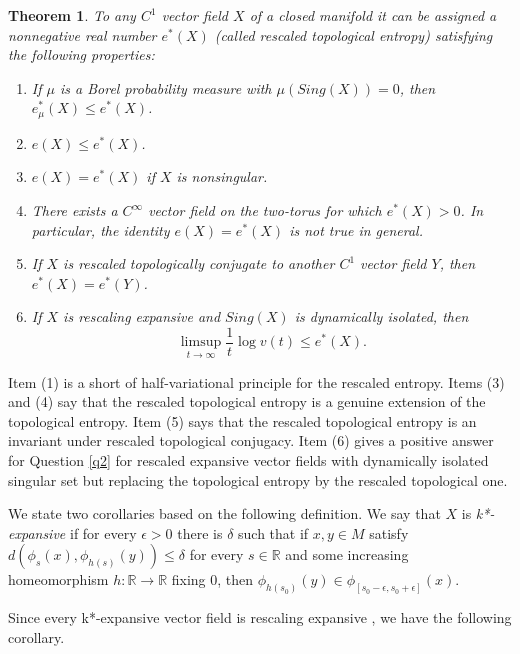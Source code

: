 \documentclass{amsart}
\newtheorem*{thrm}{Theorem}
\numberwithin{equation}{section}
\begin{document}
\begin{thrm}
To any $C^1$ vector field $X$ of a closed manifold it can be assigned a nonnegative real number $e^*(X)$ (called {\em rescaled topological entropy}) satisfying the following properties:
\begin{enumerate}
\item
If $\mu$ is a Borel probability measure with $\mu(Sing(X))=0$, then
$e^*_\mu(X)\leq e^*(X)$.
\item
\( e(X) \leq e^*(X)\).
\item
\( e(X) = e^*(X) \) if \( X \) is nonsingular.  
\item
There exists a \( C^\infty \) vector field on the two-torus for which \( e^*(X) > 0 \). In particular, the identity \( e(X) =e^*(X) \) is not true in general.
\item
If $X$ is rescaled topologically conjugate to another $C^1$ vector field $Y$, then $e^*(X)=e^*(Y)$. 
\item
If $X$ is rescaling expansive and $Sing(X)$ is dynamically isolated, then
\begin{equation}
\label{precatorinho}
\limsup_{t\to\infty}\frac{1}t\log v(t)\leq e^*(X).
\end{equation}
\end{enumerate}
\end{thrm}

Item (1) is a short of half-variational principle for the rescaled entropy.
Items (3) and (4) say that the rescaled topological entropy is a genuine extension of the topological entropy.
Item (5) says that the rescaled topological entropy is an invariant under rescaled topological conjugacy.
Item (6) gives a positive answer for Question \ref{q2} for rescaled expansive vector fields with dynamically isolated singular set but replacing the topological entropy by the rescaled topological one.

We state two corollaries based on the following definition.
We say that $X$ is {\em k*-expansive} \cite{k} if for every $\epsilon>0$ there is $\delta$ such that if $x,y\in M$ satisfy
$d(\phi_s(x),\phi_{h(s)}(y))\leq \delta$ for every $s\in\mathbb{R}$ and some increasing homeomorphism $h:\mathbb{R}\to\mathbb{R}$ fixing $0$, then $\phi_{h(s_0)}(y)\in \phi_{[s_0-\epsilon,s_0+\epsilon]}(x)$.


Since every k*-expansive vector field is rescaling expansive \cite{rwy}, we have the following corollary.
\end{document}
